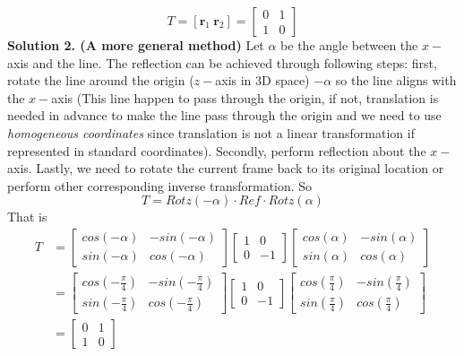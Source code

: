 \documentclass[11pt, a4paper]{article}
\begin{document}
\begin{equation*}
    T=
    [\textbf{r$_1$} \: \textbf{r$_2$}] =
    \begin{bmatrix}
    0 & 1 \\
    1 & 0
    \end{bmatrix}
\end{equation*}
\textbf{Solution 2. (A more general method)}  Let $\alpha$ be the angle between the $x-$axis and the line. The reflection can be achieved through following steps: first, rotate the line around the origin ($z-$axis in 3D space) $-\alpha$ so the line aligns with the $x-$axis (This line happen to pass through the origin, if not, translation is needed in advance to make the line pass through the origin and we need to use \emph{homogeneous coordinates} since translation is not a linear transformation if represented in standard coordinates). Secondly, perform reflection about the $x-$axis. Lastly, we need to rotate the current frame back to its original location or perform other corresponding inverse transformation. So 
\begin{equation*}
    T = Rotz(-\alpha)\cdot Ref \cdot Rotz(\alpha)
\end{equation*}
That is
\begin{equation*}
  \begin{split}
    T &= 
    \begin{bmatrix}
    cos(-\alpha) & -sin(-\alpha) \\
    sin(-\alpha) & cos(-\alpha)
    \end{bmatrix}
    \begin{bmatrix}
    1 & 0 \\
    0 & -1
    \end{bmatrix}
    \begin{bmatrix}
    cos(\alpha) & -sin(\alpha) \\
    sin(\alpha) & cos(\alpha)
    \end{bmatrix} \\
    & =
    \begin{bmatrix}
    cos(-\frac{\pi}{4}) & -sin(-\frac{\pi}{4}) \\
    sin(-\frac{\pi}{4}) & cos(-\frac{\pi}{4})
    \end{bmatrix}
    \begin{bmatrix}
    1 & 0 \\
    0 & -1
    \end{bmatrix}
    \begin{bmatrix}
    cos(\frac{\pi}{4}) & -sin(\frac{\pi}{4}) \\
    sin(\frac{\pi}{4}) & cos(\frac{\pi}{4})
    \end{bmatrix} \\
    & =
    \begin{bmatrix}
    0 & 1 \\
    1 & 0
    \end{bmatrix}
  \end{split}
\end{equation*}
\end{document}
